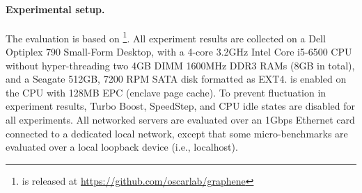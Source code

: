 


\paragraph{Experimental setup.}

The evaluation is based on \graphene{} \grapheneversion{}\footnote{\graphene{} is released at \url{https://github.com/oscarlab/graphene}}.
All experiment results are collected on a Dell Optiplex 790 Small-Form Desktop,
with a 4-core 3.2GHz Intel Core i5-6500 CPU
without hyper-threading
two 4GB DIMM 1600MHz DDR3 RAMs (8GB in total), and a Seagate 512GB, 7200 RPM SATA disk formatted as EXT4.
\sgx{} is enabled on the CPU
with 128MB EPC
(enclave page cache).
To prevent fluctuation in experiment results,
Turbo Boost, SpeedStep, and CPU idle states are disabled for
all experiments.
All networked servers are evaluated over an 1Gbps Ethernet card connected to a dedicated local network,
except that some micro-benchmarks are evaluated over a local loopback device (i.e., localhost).




